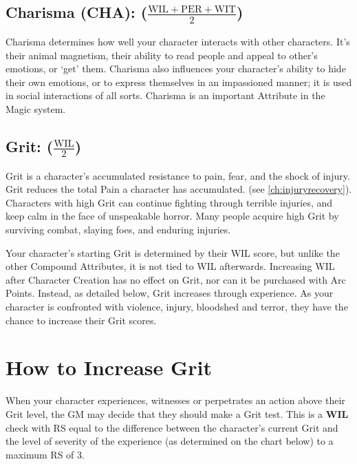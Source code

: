 \documentclass[oneside,11pt,english]{book}
\begin{document}
 

\subsection*{Charisma (CHA): ($\frac{\mathrm{WIL+PER+WIT}} {2}$)}
Charisma determines how well your character interacts with other characters. It’s their animal magnetism, 
their ability to read people and appeal to other’s emotions, or ‘get’ them. Charisma also influences your 
character’s ability to hide their own emotions, or to express themselves in an impassioned manner; it is 
used in social interactions of all sorts. Charisma is an important Attribute in the Magic system. 

 

\subsection*{Grit: ($\frac{\mathrm{WIL}}{2}$)} 
Grit is a character’s accumulated resistance to pain, fear, and the shock of injury. Grit reduces the total Pain a character has accumulated. (see \autoref{ch:injuryrecovery}). Characters with high Grit can continue fighting 
through terrible injuries, and keep calm in the face of unspeakable horror. Many people acquire high Grit 
by surviving combat, slaying foes, and enduring injuries. 


Your character’s starting Grit is determined by their WIL score, but unlike the other Compound 
Attributes, it is not tied to WIL afterwards. Increasing WIL after Character Creation has no effect on Grit, 
nor can it be purchased with Arc Points. Instead, as detailed below, Grit increases through experience. As 
your character is confronted with violence, injury, bloodshed and terror, they have the chance to increase 
their Grit scores. 
 

\section{How to Increase Grit}
When your character experiences, witnesses or perpetrates an action above their Grit level, the GM may 
decide that they should make a Grit test. This is a \textbf{WIL} check with RS equal to the difference between the character’s current Grit and the level of severity of the experience (as determined on the chart below) to a maximum RS of 3. 
\end{document}
